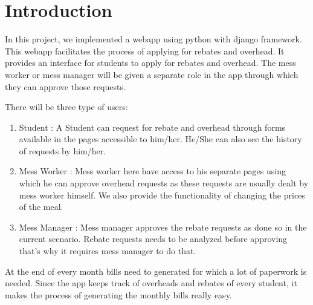 \newpage
\section{Introduction}

In this project, we implemented a webapp using python with django framework. This webapp facilitates the process of applying for rebates and overhead. It provides an interface for students to apply for rebates and overhead. The mess worker or mess manager will be given a separate role in the app through which they can approve those requests. 

There will be three type of users:
\begin{flushleft}
\begin{enumerate}
    \item Student : A Student can request for rebate and overhead through forms available in the pages accessible to him/her. He/She can also see the history of requests by him/her.
    \item Mess Worker : Mess worker here have access to his separate pages using which he can approve overhead requests as these requests are usually dealt by mess worker himself. We also provide the functionality of changing the prices of the meal.
    \item Mess Manager : Mess manager approves the rebate requests as done so in the current scenario. Rebate requests needs to be analyzed before approving that's why it requires mess manager to do that.
\end{enumerate}
\end{flushleft}
\begin{flushleft}
At the end of every month bills need to generated for which a lot of paperwork is needed. Since the app keeps track of overheads and rebates of every student, it makes the process of generating the monthly bills really easy. 
\end{flushleft}





